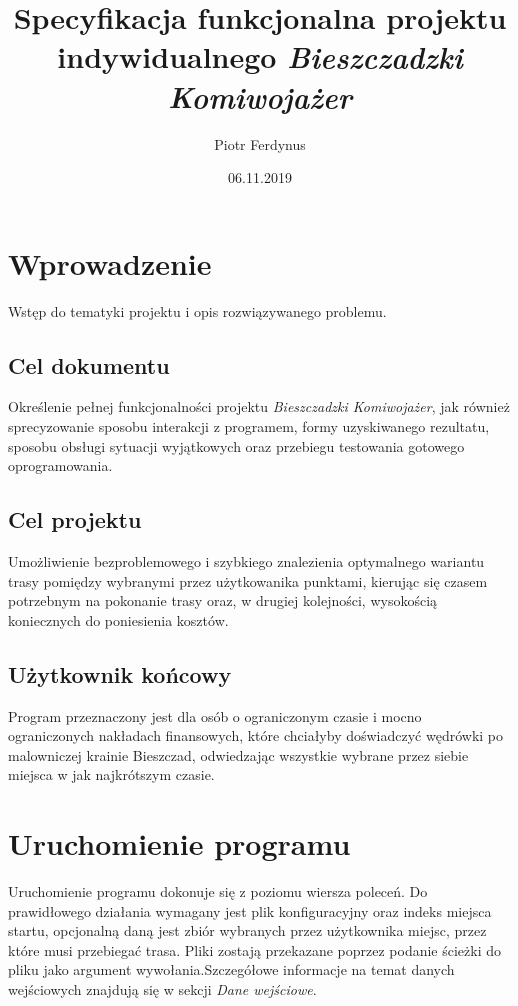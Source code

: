 \documentclass{article}
\title{Specyfikacja funkcjonalna projektu indywidualnego \textit{Bieszczadzki Komiwojażer}}
\author{Piotr Ferdynus}
\date{06.11.2019}
\begin{document}
\begin{titlepage}
\maketitle
\thispagestyle{empty}
\end{titlepage}

\lhead{}
\cfoot{\thepage \hspace{1pt} / \pageref{LastPage}}
\setcounter{page}{2}

\section{Wprowadzenie}
Wstęp do tematyki projektu i opis rozwiązywanego problemu.
\subsection{Cel dokumentu}
Określenie pełnej funkcjonalności projektu \textit{Bieszczadzki Komiwojażer}, jak również sprecyzowanie sposobu interakcji z programem, formy uzyskiwanego rezultatu, sposobu obsługi sytuacji wyjątkowych oraz przebiegu testowania gotowego oprogramowania.

\subsection{Cel projektu}
Umożliwienie bezproblemowego i szybkiego znalezienia optymalnego wariantu trasy pomiędzy wybranymi przez użytkowanika punktami, kierując się czasem potrzebnym na pokonanie trasy oraz, w drugiej kolejności, wysokością koniecznych do poniesienia kosztów.

\subsection{Użytkownik końcowy}
Program przeznaczony jest dla osób o ograniczonym czasie i mocno ograniczonych nakładach finansowych, które chciałyby doświadczyć wędrówki po malowniczej krainie Bieszczad, odwiedzając wszystkie wybrane przez siebie miejsca w jak najkrótszym czasie.


\section{Uruchomienie programu}
Uruchomienie programu dokonuje się z poziomu wiersza poleceń. Do prawidłowego działania wymagany jest plik konfiguracyjny oraz indeks miejsca startu, opcjonalną daną jest zbiór wybranych przez użytkownika miejsc, przez które musi przebiegać trasa. Pliki zostają przekazane poprzez podanie ścieżki do pliku jako argument wywołania.Szczegółowe informacje na temat danych wejściowych znajdują się w sekcji \textit{Dane wejściowe}. 
\end{document}
